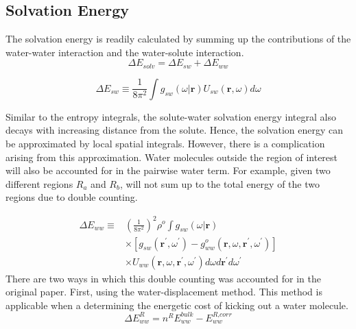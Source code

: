 \documentclass[9pt,tutorial]{livecoms}
\begin{document}
\subsection{Solvation Energy}
The solvation energy is readily calculated by summing up the contributions of the water-water interaction and the water-solute interaction.
\begin{equation}
	\Delta E_\textit{solv} = \Delta E_\textit{sw} + \Delta E_\textit{ww}
\end{equation}

\begin{equation}
	\Delta E_\textit{sw} \equiv \frac{1}{8\pi^2} \int g_\textit{sw}\left(\omega|\textbf{r}\right) U_\textit{sw}\left(\textbf{r}, \omega\right) d\omega
\end{equation}

Similar to the entropy integrals, the solute-water solvation energy integral also decays with increasing distance from the solute. Hence, the solvation energy can be approximated by local spatial integrals. However, there is a complication arising from this approximation. Water molecules outside the region of interest will also be accounted for in the pairwise water term. For example, given two different regions $R_a$ and $R_b$, will not sum up to the total energy of the two regions due to double counting. 

\begin{equation}
\begin{aligned}
	\Delta E_\textit{ww} \equiv & \left(\frac{1}{8\pi^2} \right)^2 \rho^o \int g_\textit{sw}\left(\omega|\textbf{r}\right) \\
	& \times \left[g_\textit{sw}\left(\textbf{r}^\prime , \omega^\prime \right) - g^o_\textit{ww} \left(\textbf{r}, \omega, \textbf{r}^\prime, \omega^\prime \right)\right] \\
	& \times U_\textit{ww}\left(\textbf{r}, \omega, \textbf{r}^\prime, \omega^\prime\right)d\omega d\textbf{r}^\prime d\omega^\prime
\end{aligned}
\end{equation}
There are two ways in which this double counting was accounted for in the original paper. First, using the water-displacement method. This method is applicable when a determining the energetic cost of kicking out a water molecule. 
\begin{equation}
	\Delta E^R_\textit{ww} = n^\textit{R} E^\textit{bulk}_\textit{ww} - E^\textit{R,corr}_\textit{ww}
\end{equation}
\end{document}
